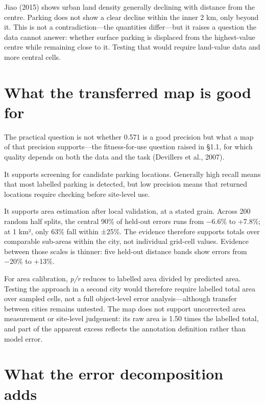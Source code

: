 Jiao (2015) shows urban land density generally declining with distance from the centre. Parking does not show a clear decline within the inner 2 km, only beyond it. This is not a contradiction---the quantities differ---but it raises a question the data cannot answer: whether surface parking is displaced from the highest-value centre while remaining close to it. Testing that would require land-value data and more central cells.

\hypertarget{what-the-transferred-map-is-good-for}{%
\section{What the transferred map is good for}\label{what-the-transferred-map-is-good-for}}

The practical question is not whether 0.571 is a good precision but what a map of that precision supports---the fitness-for-use question raised in §1.1, for which quality depends on both the data and the task (Devillers et al., 2007).

It supports screening for candidate parking locations. Generally high recall means that most labelled parking is detected, but low precision means that returned locations require checking before site-level use.

It supports area estimation after local validation, at a stated grain. Across 200 random half splits, the central 90\% of held-out errors runs from −6.6\% to +7.8\%; at 1 km², only 63\% fall within ±25\%. The evidence therefore supports totals over comparable sub-areas within the city, not individual grid-cell values. Evidence between those scales is thinner: five held-out distance bands show errors from −20\% to +13\%.

For area calibration, \emph{p/r} reduces to labelled area divided by predicted area. Testing the approach in a second city would therefore require labelled total area over sampled cells, not a full object-level error analysis---although transfer between cities remains untested. The map does not support uncorrected area measurement or site-level judgement: its raw area is 1.50 times the labelled total, and part of the apparent excess reflects the annotation definition rather than model error.

\hypertarget{what-the-error-decomposition-adds}{%
\section{What the error decomposition adds}\label{what-the-error-decomposition-adds}}

